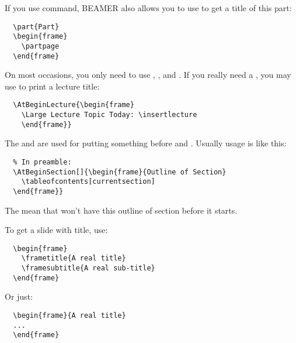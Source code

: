 \documentclass{beamer}
\newcommand{\Beamer}{\textrm{BEAMER}}
\newcommand{\cmd}[2][blue]{{\color{#1}{\ttfamily\char92 #2}}}
\newcommand{\imp}[1]{{\color{red}{#1}}}
\begin{document}
\begin{frame}[fragile]
  If you use \cmd{part} command, \Beamer{} also allows you to use \cmd{partpage} to get a title of this part:
  \begin{lstlisting}
  \part{Part}
  \begin{frame}
    \partpage
  \end{frame}
  \end{lstlisting}
  On most occasions, you only need to use \cmd{part}, \cmd{section}, and \cmd{subsection}. If you really need a \cmd{lecture}, you may use \cmd[orange]{insertlecture} to print a lecture title:
  \begin{lstlisting}
  \AtBeginLecture{\begin{frame}
    \Large Lecture Topic Today: \insertlecture
    \end{frame}}
  \end{lstlisting}
\end{frame}

\begin{frame}[fragile]
  The \cmd{AtBeginLecture} and \cmd{AtBeginSection} are used for putting something before \cmd{lecture} and \cmd{section}. Usually usage is like this:
  \begin{lstlisting}
  % In preamble: 
  \AtBeginSection[]{\begin{frame}{Outline of Section}
    \tableofcontents[currentsection]
  \end{frame}}
  \end{lstlisting}
  The \imp{empty square brackets} mean that \cmd{section*} won't have this outline of section before it starts.
\end{frame}

\begin{frame}[fragile]
  To get a slide with title, use:
  \begin{lstlisting}
  \begin{frame}
    \frametitle{A real title}
    \framesubtitle{A real sub-title}
  \end{frame}
  \end{lstlisting}
  Or just:
  \begin{lstlisting}
  \begin{frame}{A real title}
  ...
  \end{frame}
  \end{lstlisting}
\end{frame}
\end{document}
